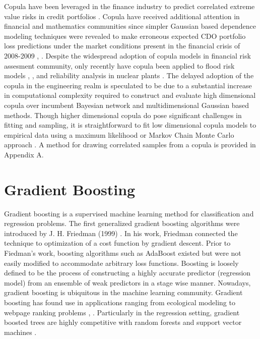Copula have been leveraged in the finance industry to
predict correlated extreme value risks in credit portfolios
\cite{Geidosch2016}.  Copula have received additional attention in financial and mathematics communities since 
simpler Gaussian based dependence modeling techniques were revealed to make erroneous expected CDO portfolio loss predictions under the market conditions present in the financial crisis of
2008-2009 \cite{MacKenzie2013}, \cite{Li2000}.  Despite the widespread adoption of copula models in financial risk assesment community, only recently have copula been applied to flood risk
models \cite{Dupuis2007}, \cite{Ganguli2012}, and reliability analysis in nuclear plants
\cite{Kelly2007}.  The delayed adoption of the copula in the
engineering realm is speculated to be due to a substantial increase in computational
complexity required to construct and evaluate high dimensional copula over
incumbent Bayesian network and multidimensional Gaussian based methods.  
Though higher dimensional copula do pose significant challenges in fitting and sampling, it is straightforward to fit low dimensional copula models to empirical data
using a maximum likelihood or Markov Chain Monte Carlo approach \cite{Jouini1996}.
A method for drawing correlated samples from a copula is provided in Appendix A.

\section{Gradient Boosting}

Gradient boosting is a supervised machine learning method for classification and regression problems.
The first generalized gradient boosting algorithms were introduced by J. H. Friedman (1999) \cite{friedman2001}.  In his work, Friedman connected the technique to optimization of a cost function by gradient descent.  Prior to Fiedman's work, boosting algorithms such as AdaBoost existed but were not easily modified to accommodate arbitrary loss functions.  Boosting is loosely defined to be the process of constructing a highly accurate predictor (regression model) from an ensemble of weak predictors in a stage wise manner.
Nowadays, gradient boosting is ubiquitous in the machine learning community.  Gradient boosting has found use in applications ranging from ecological modeling \cite{death2007} to webpage ranking problems \cite{Tyree2011}, \cite{chapelle2011}.  Particularly in the regression setting, gradient boosted trees are highly competitive with random forests and support vector machines \cite{moisen2006}.


